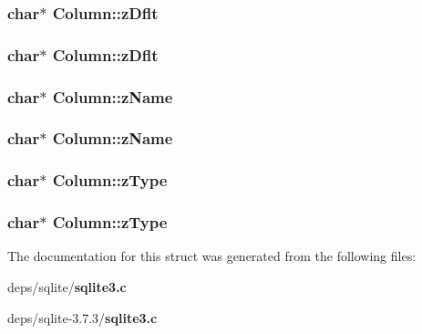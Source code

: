 \subsubsection{\setlength{\rightskip}{0pt plus 5cm}char$\ast$ \bf{Column::z\-Dflt}}\label{structColumn_a1a839b3073caf4d2707779920cc1617}


\subsubsection{\setlength{\rightskip}{0pt plus 5cm}char$\ast$ \bf{Column::z\-Dflt}}\label{structColumn_a1a839b3073caf4d2707779920cc1617}


\subsubsection{\setlength{\rightskip}{0pt plus 5cm}char$\ast$ \bf{Column::z\-Name}}\label{structColumn_449e2d9f46fdbcd6383b534ae6cbca1b}


\subsubsection{\setlength{\rightskip}{0pt plus 5cm}char$\ast$ \bf{Column::z\-Name}}\label{structColumn_449e2d9f46fdbcd6383b534ae6cbca1b}


\subsubsection{\setlength{\rightskip}{0pt plus 5cm}char$\ast$ \bf{Column::z\-Type}}\label{structColumn_ca44f76a5bc4e3b0f282e26f316b640b}


\subsubsection{\setlength{\rightskip}{0pt plus 5cm}char$\ast$ \bf{Column::z\-Type}}\label{structColumn_ca44f76a5bc4e3b0f282e26f316b640b}




The documentation for this struct was generated from the following files:\begin{CompactItemize}
\item 
deps/sqlite/\bf{sqlite3.c}\item 
deps/sqlite-3.7.3/\bf{sqlite3.c}\end{CompactItemize}
